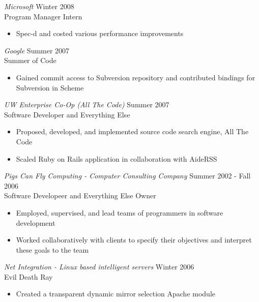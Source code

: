 \documentclass[10pt,line,margin=0.1]{newsres}
\begin{document}
\begin{resume}
\begin{itemize}
                \end{itemize} 
                {\sl Microsoft} \hfill        Winter 2008 \\
                Program Manager Intern
                \begin{itemize}
                \item Spec-d and costed various performance improvements
                \end{itemize} 
                {\sl Google} \hfill        Summer 2007 \\
                Summer of Code
                  \begin{itemize}
                   \item Gained commit access to Subversion repository and contributed bindings for Subversion in Scheme
                   \end{itemize} 
                {\sl UW Enterprise Co-Op (All The Code)} \hfill Summer 2007 \\
                Software Developer and Everything Else
                \begin{itemize}  \itemsep -2pt %
                  \item{Proposed, developed, and implemented source code search engine, All The Code}
                  \item{Scaled Ruby on Rails application in collaboration with AideRSS}
                \end{itemize}
                {\sl Pigs Can Fly Computing - Computer Consulting Company} \hfill Summer 2002 - Fall 2006 \\
                Software Developeer and Everything Else Owner
                \begin{itemize}  \itemsep -2pt %
                  \item{Employed, supervised, and lead teams of programmers in software development}
                  \item{Worked collaboratively with clients to specify their objectives and interpret these goals to the team}
                \end{itemize}
                {\sl Net Integration - Linux based intelligent servers} \hfill Winter 2006 \\
                Evil Death Ray
                \begin{itemize}  \itemsep -2pt %
                  \item{Created a transparent dynamic mirror selection Apache module}

\end{itemize}
\end{resume}
\end{document}
